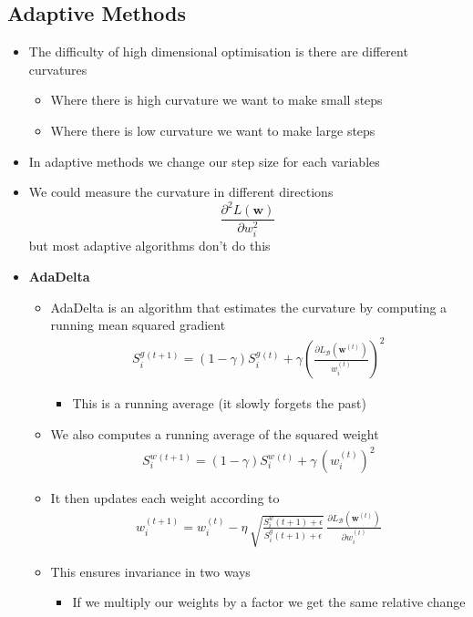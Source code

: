\documentclass[11pt]{article}
\begin{document}
\subsection{Adaptive Methods}
\label{sec:orgbd70b96}
\begin{itemize}
\item The difficulty of high dimensional optimisation is there are different curvatures
\begin{itemize}
\item Where there is high curvature we want to make small steps
\item Where there is low curvature we want to make large steps
\end{itemize}
\item In adaptive methods we change our step size for each variables
\item We could measure the curvature in different directions
$$ \frac{\partial^2 L(\bm{w})}{\partial w_i^2} $$
but most adaptive algorithms don't do this
\item \textbf{AdaDelta}
\begin{itemize}
\item AdaDelta is an algorithm  that estimates the curvature by computing
a running mean squared gradient
\begin{align*}
   S^g_i^{(t+1)} = (1-\gamma) S^g_i^{(t)} + \gamma \left(
   \frac{\partial L_{\mathcal{B}}(\bm{w}^{(t)})}{w_i^{(t)}} \right)^2
\end{align*}
\begin{itemize}
\item This is a running average (it slowly forgets the past)
\end{itemize}
\item We also computes a running average of the squared weight
\begin{align*}
  S^w_i^{(t+1)} = (1-\gamma) S^w_i^{(t)} + \gamma  \, (w_i^{(t)})^2
\end{align*}
\item It then updates each weight according to
\begin{align*}
  w_i^{(t+1)} = w_i^{(t)} - \eta \,
  \sqrt{\frac{S^w_i(t+1)+\epsilon}{S^g_i(t+1)+\epsilon}}\,
  \frac{\partial L_{\mathcal{B}}(\bm{w}^{(t)})}{\partial w_i^{(t)}}
\end{align*}
\item This ensures invariance in two ways
\begin{itemize}
\item If we multiply our weights by a factor we get the same relative change

\end{itemize}
\end{itemize}
\end{itemize}
\end{document}
